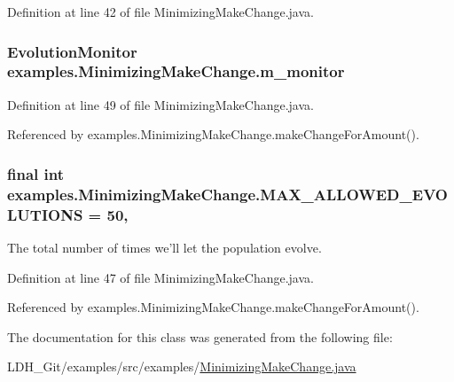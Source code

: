 Definition at line 42 of file Minimizing\-Make\-Change.\-java.

\hypertarget{classexamples_1_1_minimizing_make_change_ac2bd233483d61d35e663cdcde7fae07a}{
\subsubsection[{m\-\_\-monitor}]{\setlength{\rightskip}{0pt plus 5cm}Evolution\-Monitor examples.\-Minimizing\-Make\-Change.\-m\-\_\-monitor\hspace{0.3cm}{\ttfamily [static]}}}\label{classexamples_1_1_minimizing_make_change_ac2bd233483d61d35e663cdcde7fae07a}


Definition at line 49 of file Minimizing\-Make\-Change.\-java.



Referenced by examples.\-Minimizing\-Make\-Change.\-make\-Change\-For\-Amount().

\hypertarget{classexamples_1_1_minimizing_make_change_ae2d2ac25bf02f1feff515e58a908557c}{
\subsubsection[{M\-A\-X\-\_\-\-A\-L\-L\-O\-W\-E\-D\-\_\-\-E\-V\-O\-L\-U\-T\-I\-O\-N\-S}]{\setlength{\rightskip}{0pt plus 5cm}final int examples.\-Minimizing\-Make\-Change.\-M\-A\-X\-\_\-\-A\-L\-L\-O\-W\-E\-D\-\_\-\-E\-V\-O\-L\-U\-T\-I\-O\-N\-S = 50\hspace{0.3cm}{\ttfamily [static]}, {\ttfamily [private]}}}\label{classexamples_1_1_minimizing_make_change_ae2d2ac25bf02f1feff515e58a908557c}
The total number of times we'll let the population evolve. 

Definition at line 47 of file Minimizing\-Make\-Change.\-java.



Referenced by examples.\-Minimizing\-Make\-Change.\-make\-Change\-For\-Amount().



The documentation for this class was generated from the following file\-:\begin{DoxyCompactItemize}
\item 
L\-D\-H\-\_\-\-Git/examples/src/examples/\hyperlink{_minimizing_make_change_8java}{Minimizing\-Make\-Change.\-java}\end{DoxyCompactItemize}
